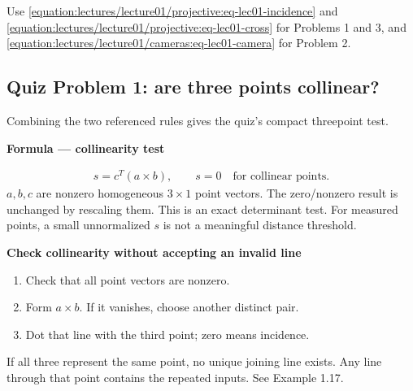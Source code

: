 \documentclass[letterpaper,11pt,english,openany,oneside]{jupyterBook}
\begin{document}
\sphinxAtStartPar
Use \eqref{equation:lectures/lecture01/projective:eq-lec01-incidence} and \eqref{equation:lectures/lecture01/projective:eq-lec01-cross} for Problems 1 and 3, and \eqref{equation:lectures/lecture01/cameras:eq-lec01-camera} for Problem 2.


\subsection{Quiz Problem 1: are three points collinear?}
\label{\detokenize{lectures/lecture01/quiz-practice:quiz-problem-1-are-three-points-collinear}}
\sphinxAtStartPar
Combining the two referenced rules gives the quiz’s compact three\sphinxhyphen{}point test.

\begin{TextbookBox}
\textbf{Formula — collinearity test}\par\smallskip
\begin{equation}\label{equation:lectures/lecture01/quiz-practice:eq-lec02-collinear}
\begin{split}s=c^T(a\times b),\qquad s=0\quad\text{for collinear points}.\end{split}
\end{equation}
\sphinxAtStartPar
\(a,b,c\) are nonzero homogeneous \(3\times1\) point vectors. The zero/nonzero result is unchanged by rescaling them. This is an exact determinant test. For measured points, a small unnormalized \(s\) is not a meaningful distance threshold.

\end{TextbookBox}

\begin{TextbookBox}
\textbf{Check collinearity without accepting an invalid line}\par\smallskip
\begin{enumerate}
%
\item {}
\sphinxAtStartPar
Check that all point vectors are nonzero.

\item {}
\sphinxAtStartPar
Form \(a\times b\). If it vanishes, choose another distinct pair.

\item {}
\sphinxAtStartPar
Dot that line with the third point; zero means incidence.

\end{enumerate}

\sphinxAtStartPar
If all three represent the same point, no unique joining line exists. Any line through that point contains the repeated inputs. See Example 1.17.

\end{TextbookBox}
\end{document}
